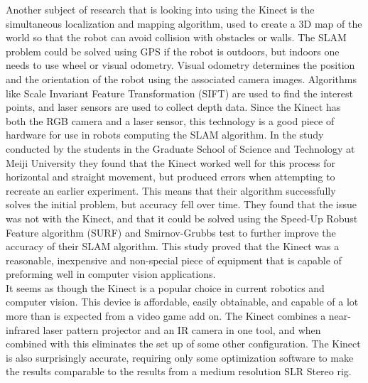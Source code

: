 \documentclass[12pt,twocolumn]{article}
\begin{document}
\indent	Another subject of research that is looking into using the Kinect is the simultaneous localization and mapping algorithm, used to create a 3D map of the world so that the robot can avoid collision with obstacles or walls. The SLAM problem could be solved using GPS if the robot is outdoors, but indoors one needs to use wheel or visual odometry. Visual odometry determines the position and the orientation of the robot using the associated camera images. Algorithms like Scale Invariant Feature Transformation (SIFT) are used to find the interest points, and laser sensors are used to collect depth data. Since the Kinect has both the RGB camera and a laser sensor, this technology is a good piece of hardware for use in robots computing the SLAM algorithm. In the study conducted by the students in the Graduate School of Science and Technology at Meiji University they found that the Kinect worked well for this process for horizontal and straight movement, but produced errors when attempting to recreate an earlier experiment. This means that their algorithm successfully solves the initial problem, but accuracy fell over time.\cite{cite2} They found that the issue was not with the Kinect, and that it could be solved using the Speed-Up Robust Feature algorithm (SURF) and Smirnov-Grubbs test to further improve the accuracy of their SLAM algorithm. This study proved that the Kinect was a reasonable, inexpensive and non-special piece of equipment that is capable of preforming well in computer vision applications. \\
\indent	It seems as though the Kinect is a popular choice in current robotics and computer vision. This device is affordable, easily obtainable, and capable of a lot more than is expected from a video game add on. The Kinect combines a near-infrared laser pattern projector and an IR camera in one tool, and when combined with this eliminates the set up of some other configuration. The Kinect is also surprisingly accurate, requiring only some optimization software to make the results comparable to the results from a medium resolution SLR Stereo rig.\\
\end{document}
